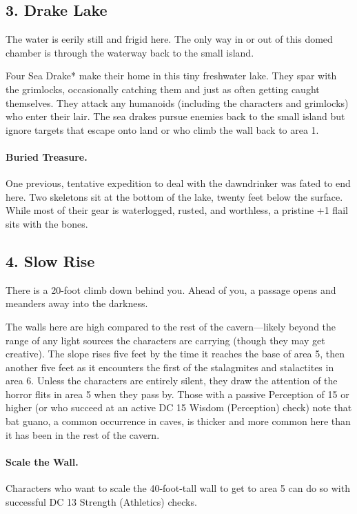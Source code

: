 \documentclass[10pt,a4paper,twoside,twocolumn,openany,bg=print,nodeprecatedcode]{dndbook}
\begin{document}
\subsection{3. Drake Lake}
\begin{DndReadAloud}{}
The water is eerily still and frigid here. The only way in or out of this domed chamber is through the waterway back to the small island.
\end{DndReadAloud}

Four Sea Drake* make their home in this tiny freshwater lake. They spar with the grimlocks, occasionally catching them and just as often getting caught themselves. They attack any humanoids (including the characters and grimlocks) who enter their lair. The sea drakes pursue enemies back to the small island but ignore targets that escape onto land or who climb the wall back to area 1.
\paragraph{Buried Treasure.}
One previous, tentative expedition to deal with the dawndrinker was fated to end here. Two skeletons sit at the bottom of the lake, twenty feet below the surface. While most of their gear is waterlogged, rusted, and worthless, a pristine +1 flail sits with the bones.
\subsection{4. Slow Rise}
\begin{DndReadAloud}{}
There is a 20-foot climb down behind you. Ahead of you, a passage opens and meanders away into the darkness.
\end{DndReadAloud}

The walls here are high compared to the rest of the cavern—likely beyond the range of any light sources the characters are carrying (though they may get creative). The slope rises five feet by the time it reaches the base of area 5, then another five feet as it encounters the first of the stalagmites and stalactites in area 6.
Unless the characters are entirely silent, they draw the attention of the horror flits in area 5 when they pass by. Those with a passive Perception of 15 or higher (or who succeed at an active DC 15 Wisdom (Perception) check) note that bat guano, a common occurrence in caves, is thicker and more common here than it has been in the rest of the cavern.
\paragraph{Scale the Wall.}
Characters who want to scale the 40-foot-tall wall to get to area 5 can do so with successful DC 13 Strength (Athletics) checks.
\end{document}
